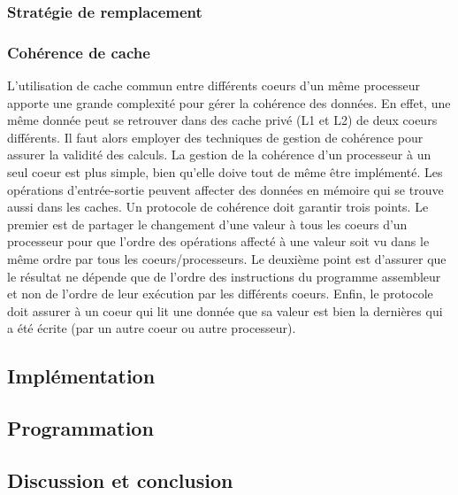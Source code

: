 \subsubsection{Stratégie de remplacement}







\subsubsection{Cohérence de cache}
L'utilisation de cache commun entre différents coeurs d'un même processeur apporte une grande complexité pour gérer la cohérence des données. En effet, une même donnée peut se retrouver dans des cache privé (L1 et L2) de deux coeurs différents. Il faut alors employer des techniques de gestion de cohérence pour assurer la validité des calculs. La gestion de la cohérence d'un processeur à un seul coeur est plus simple, bien qu'elle doive tout de même être implémenté. Les opérations d'entrée-sortie peuvent affecter des données en mémoire qui se trouve aussi dans les caches. Un protocole de cohérence doit garantir trois points. Le premier est de partager le changement d'une valeur à tous les coeurs d'un processeur pour que l'ordre des opérations affecté à une valeur soit vu dans le même ordre par tous les coeurs/processeurs. Le deuxième point est d'assurer que le résultat ne dépende que de l'ordre des instructions du programme assembleur et non de l'ordre de leur exécution par les différents coeurs. Enfin, le protocole doit assurer à un coeur qui lit une donnée que sa valeur est bien la dernières qui a été écrite (par un autre coeur ou autre processeur). 



\subsection{Implémentation}

\subsection{Programmation}

\subsection{Discussion et conclusion}

